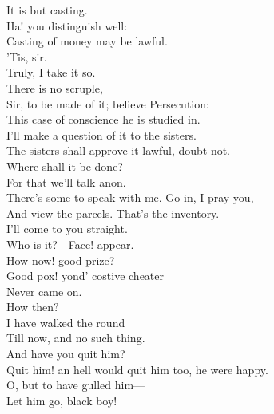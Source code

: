 \documentclass[a4paper,oneside,12pt]{memoir}
\begin{document}
\begin{drama*}
It is but casting.\\
\tribulationspeaks {} Ha! you distinguish well:\\
Casting of money may be lawful.\\
\persecutionspeaks {} 'Tis, sir.\\
\tribulationspeaks Truly, I take it so.\\
\subtlespeaks {} There is no scruple,\\
Sir, to be made of it; believe Persecution:\\
This case of conscience he is studied in.\\
\tribulationspeaks I'll make a question of it to the sisters.\\
\persecutionspeaks The sisters shall approve it lawful, doubt not.\\
Where shall it be done?\\
\subtlespeaks {} For that we'll talk anon.\\
There's some to speak with me. Go in, I pray you,\\
And view the parcels. That's the inventory.\\
I'll come to you straight.\\
 Who is it?---Face! appear.\\
How now! good prize?\\
\facespeaks {} Good pox! yond' costive cheater\\
Never came on.\\
\subtlespeaks {} How then?\\
\facespeaks {} I have walked the round\\
Till now, and no such thing.\\
\subtlespeaks {} And have you quit him?\\
\facespeaks Quit him! an hell would quit him too, he were happy.\\
\subtlespeaks O, but to have gulled him---\\
\facespeaks {} Let him go, black boy!\\

\end{drama*}
\end{document}
